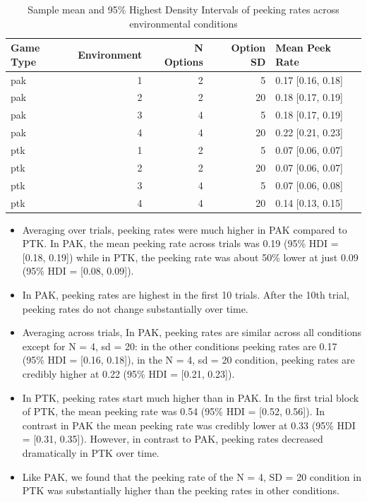 \documentclass[a4paper,doc,natbib,floatsintext]{apa6}\usepackage[]{graphicx}\usepackage[]{color}
\begin{document}
\begin{table}[ht]
\centering
\begin{tabular}{lrrrl}
  \hline
Game Type & Environment & N Options & Option SD & Mean Peek Rate \\ 
  \hline
pak &   1 &   2 &   5 & 0.17 [0.16, 0.18] \\ 
  pak &   2 &   2 &  20 & 0.18 [0.17, 0.19] \\ 
  pak &   3 &   4 &   5 & 0.18 [0.17, 0.19] \\ 
  pak &   4 &   4 &  20 & 0.22 [0.21, 0.23] \\ 
  ptk &   1 &   2 &   5 & 0.07 [0.06, 0.07] \\ 
  ptk &   2 &   2 &  20 & 0.07 [0.06, 0.07] \\ 
  ptk &   3 &   4 &   5 & 0.07 [0.06, 0.08] \\ 
  ptk &   4 &   4 &  20 & 0.14 [0.13, 0.15] \\ 
   \hline
\end{tabular}
\caption{Sample mean and 95\% Highest Density Intervals of peeking rates across environmental conditions} 
\label{table:peekdf}
\end{table}



\begin{itemize}

  \item Averaging over trials, peeking rates were much higher in PAK compared to PTK. In PAK, the mean peeking rate across trials was 0.19 (95\% HDI = [0.18, 0.19]) while in PTK, the peeking rate was about 50\% lower at just 0.09 (95\% HDI = [0.08, 0.09]).

  \item In PAK, peeking rates are highest in the first 10 trials. After the 10th trial, peeking rates do not change substantially over time.
  
  \item Averaging across trials, In PAK, peeking rates are similar across all conditions except for N = 4, sd = 20: in the other conditions peeking rates are 0.17 (95\% HDI = [0.16, 0.18]), in the N = 4, sd = 20 condition, peeking rates are credibly higher at 0.22 (95\% HDI = [0.21, 0.23]).
  
  \item In PTK, peeking rates start much higher than in PAK. In the first trial block of PTK, the mean peeking rate was 0.54 (95\% HDI = [0.52, 0.56]). In contrast in PAK the mean peeking rate was credibly lower at 0.33 (95\% HDI = [0.31, 0.35]). However, in contrast to PAK, peeking rates decreased dramatically in PTK over time.
  
  \item Like PAK, we found that the peeking rate of the N = 4, SD = 20 condition in PTK was substantially higher than the peeking rates in other conditions.
  


\end{itemize}
\end{document}
